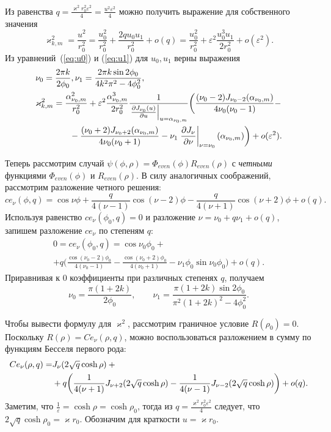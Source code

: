 Из равенства $q=\frac{\varkappa^2 r_0^2 \varepsilon^2}{4}=\frac{u^2 \varepsilon^2}{4}$ можно получить выражение для собственного значения
$$\varkappa_{k, m}^2 = \frac{u^2}{r_0^2} = \frac{u_0^2}{r_0^2} + \frac{2 q u_0 u_1}{r_0^2} + o(q)= \frac{u_0^2}{r_0^2} +  \varepsilon^2 \frac{u_0^3 u_1}{2 r_0^2} + o(\varepsilon^2).$$ 
Из уравнений~(\ref{eq:u0}) и (\ref{eq:u1}) для $u_0, u_1$ верны выражения
\begin{align}
  & \nu_0 = \frac{2\pi k}{2\phi_0},   \nu_1 = \frac{2 \pi k \sin 2 \phi_0}{4 k^2\pi^2  - 4\phi_0^2},\\
   & \varkappa_{k, m}^2 = \frac{\alpha_{\nu_0, m}^2}{r_0^2} 
+  \varepsilon^2 \frac{\alpha_{\nu_0, m}^3}{2 r_0^2}\frac{1}{ \left.\frac{\partial J_{\nu_0}(u)}{\partial u}\right|_{u=\alpha_{\nu_0, m}} } \biggl(
\frac{(\nu_0 - 2)J_{\nu_0-2}(\alpha_{\nu_0, m})   }{4\nu_0 (\nu_0-1)} - \notag \\
&\qquad\qquad{}- \frac{(\nu_0 + 2)J_{\nu_0+2}(\alpha_{\nu_0, m})}{4\nu_0 (\nu_0+1)} - \nu_1 \left.\frac{\partial J_\nu}{\partial \nu}\right|_{\nu = \nu_0}(\alpha_{\nu_0, m})
    \biggr) + o(\varepsilon^2).
 \label{eq:oddSe_nueigenvalues}
 \end{align}


Теперь рассмотрим случай  $\psi(\phi, \rho) = \Phi_{even}(\phi) R_{even}(\rho)$ с \textit{четными} функциями $ \Phi_{even}(\phi) $ и $R_{even}(\rho)$. 
В силу аналогичных соображений, рассмотрим разложение четного решения:
\[
ce_\nu(\phi, q) = 	\cos{\nu\phi} + 
	\frac{q}{4(\nu-1)} \cos{(\nu-2)\phi} -\frac{q}{4(\nu+1)} \cos{(\nu+2)\phi} + o(q).
\]
Используя равенство $ce_\nu(\phi_0, q)=0$ и разложение $\nu = \nu_0 + q \nu_1 + o(q)$,
запишем разложение $ce_\nu$  по степеням $q$:
\begin{multline*}
0=ce_\nu(\phi_0, q) = 	\cos{\nu_0\phi_0}  + \\
+q \biggl(	\frac{\cos{(\nu_0-2)\phi_0}}{4(\nu_0-1)}  -\frac{\cos{(\nu_0+2)\phi_0}}{4(\nu_0+1)} - \nu_1 \phi_0 \sin \nu_0 \phi_0 \biggr) + o(q).
 \end{multline*}
Приравнивая к  $0$ коэффициенты при различных степенях  $q$, получаем
\begin{equation*}
    \nu_0 = \frac{\pi (1 + 2 k)}{2 \phi_0}, \qquad \nu_1 = \frac{\pi (1+2k) \sin 2\phi_0}{\pi^2(1+2k)^2 - 4\phi_0^2}.
\end{equation*}

Чтобы вывести формулу для  $\varkappa^2$, рассмотрим граничное условие $R(\rho_0) = 0$. 
Поскольку $R(\rho) = Ce_\nu(\rho, q)$, можно воспользоваться разложением в сумму по функциям Бесселя первого рода:
\begin{align*}
Ce_\nu(\rho, q) = & J_\nu(2\sqrt{q} \cosh{\rho}) + {}\notag \\
&{}+q \biggl( \frac{1}{4(\nu+1)} J_{\nu+2}(2\sqrt{q}\cosh{\rho}) -\frac{1}{4(\nu-1)} J_{\nu-2}(2\sqrt{q} \cosh{\rho})
\biggr) + o(q).
\end{align*}
Заметим, что $\frac{1}{\varepsilon} = \cosh \rho = \cosh \rho_0 $, тогда из  $q = \frac{\varkappa^2 r_0^2 \varepsilon^2}{4}$ следует, что $2\sqrt{q} \cosh{\rho_0} =   \varkappa r_0$. 
Обозначим для краткости $u = \varkappa r_0$. 

